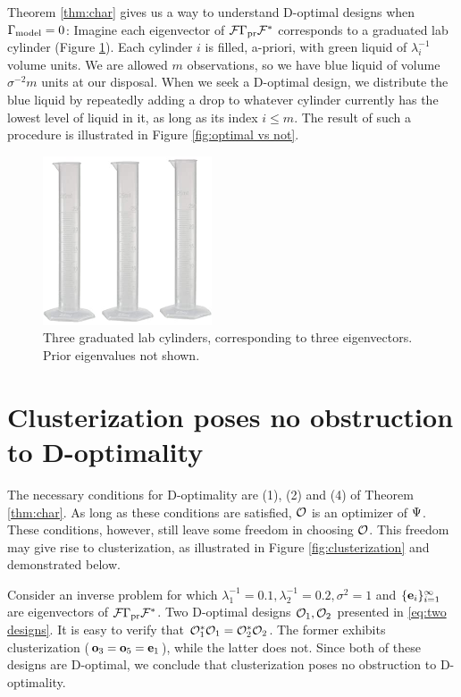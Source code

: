 Theorem \ref{thm:char} gives us a way to understand D-optimal designs
when $\Gamma_{\textup{model}} = 0$: Imagine each eigenvector of $\mathcal{F} \Gamma_{\textup{pr}} \mathcal{F}^*$
corresponds to a graduated lab cylinder (Figure
\ref{fig:cylinder}). Each cylinder $i$ is filled, a-priori, with green
liquid of $\lambda_i^{-1}$ volume units. We are allowed $m$
observations, so we have blue liquid of volume $\sigma^{-2}m$ units at
our disposal. When we seek a D-optimal design, we distribute the blue
liquid by repeatedly adding a drop to whatever cylinder currently has
the lowest level of liquid in it, as long as its index $i \leq m$. The
result of such a procedure is illustrated in Figure \ref{fig:optimal
  vs not}.

\begin{figure}%
    \includegraphics[width=5cm, height=5cm]{cylinders.jpg}
    \caption{Three graduated lab cylinders, corresponding to three
      eigenvectors. Prior eigenvalues not shown.}
    \label{fig:cylinder}
\end{figure}



\section{Clusterization poses no obstruction to D-optimality}\label{section:clusterization}
The necessary conditions for D-optimality are (1), (2) and (4) of
Theorem \ref{thm:char}. As long as these conditions are satisfied,
$\mathcal{O}$ is an optimizer of $\Psi$. These conditions, however, still
leave some freedom in choosing $\mathcal{O}$. This freedom may give rise to
clusterization, as illustrated in Figure \ref{fig:clusterization} and
demonstrated below.

Consider an inverse problem for which $\lambda_1^{-1} = 0.1,
\lambda_2^{-1} = 0.2,\sigma^2=1$ and $\{\mathbf{e}_i\}_{i=1}^\infty$ are
eigenvectors of $\mathcal{F}\Gamma_{\textup{pr}}\mathcal{F}^*$. Two D-optimal designs $\mathcal{O}_1,
\mathcal{O}_2$ presented in \eqref{eq:two designs}. It is easy to verify that
$\mathcal{O}_1^*\mathcal{O}_1 = \mathcal{O}_2^*\mathcal{O}_2$. The former exhibits clusterization
($\mathbf{o}_3 = \mathbf{o}_5 = \mathbf{e}_1$), while the latter does not. Since both
of these designs are D-optimal, we conclude that clusterization poses
no obstruction to D-optimality.

